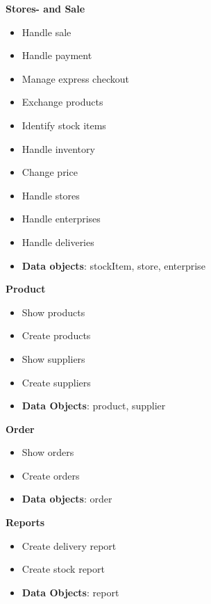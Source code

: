 \begin{multicols}{2}
	\textbf{Stores- and Sale}
	\begin{flushleft}
		\begin{itemize}[noitemsep]
			\item Handle sale
			\item Handle payment
			\item Manage express checkout
			\item Exchange products
			\item Identify stock items
			\item Handle inventory
			\item Change price
			\item Handle stores
			\item Handle enterprises
			\item Handle deliveries
			\item \textbf{Data objects}: stockItem, store, enterprise
		\end{itemize}
	\end{flushleft}
	
	
	\vfill
	\columnbreak
	\textbf{Product}
	\begin{flushleft}
		\begin{itemize}[noitemsep]
			\item Show products
			\item Create products
			\item Show suppliers
			\item Create suppliers
			\item \textbf{Data Objects}: product, supplier
		
		
		\end{itemize}
	\end{flushleft}

\end{multicols}




\begin{multicols}{2}
	\textbf{Order}
	\begin{flushleft}
		\begin{itemize}[noitemsep]
			\item Show orders
			\item Create orders
			\item \textbf{Data objects}: order
		\end{itemize}
	\end{flushleft}
	
	
    	\vfill
	\columnbreak
	\textbf{Reports}
	\begin{flushleft}
		\begin{itemize}[noitemsep]
			\item Create delivery report
			\item Create stock report
			\item \textbf{Data Objects}: report  
	
		\end{itemize}
	\end{flushleft}
\end{multicols}





